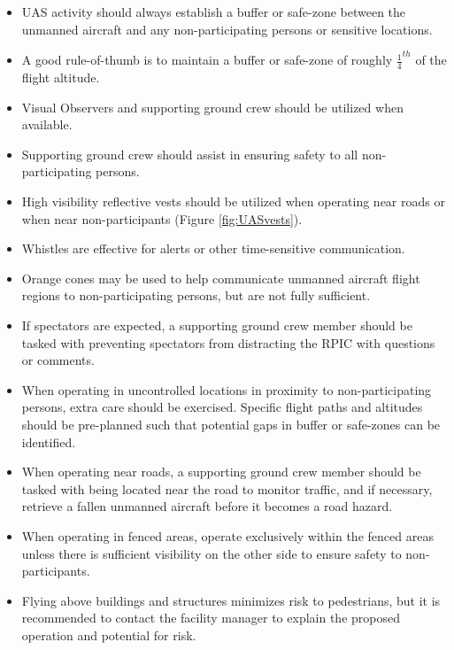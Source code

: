 \documentclass[
]{book}
\providecommand{\tightlist}{%
  \setlength{\itemsep}{0pt}\setlength{\parskip}{0pt}}
\begin{document}
\begin{itemize}
\tightlist
\item
  UAS activity should always establish a buffer or safe-zone between the unmanned aircraft and any non-participating persons or sensitive locations.\\
\item
  A good rule-of-thumb is to maintain a buffer or safe-zone of roughly \(\frac{1}{4}^{th}\) of the flight altitude.\\
\item
  Visual Observers and supporting ground crew should be utilized when available.
\item
  Supporting ground crew should assist in ensuring safety to all non-participating persons.
\item
  High visibility reflective vests should be utilized when operating near roads or when near non-participants (Figure \ref{fig:UASvests}).
\item
  Whistles are effective for alerts or other time-sensitive communication.
\item
  Orange cones may be used to help communicate unmanned aircraft flight regions to non-participating persons, but are not fully sufficient.
\item
  If spectators are expected, a supporting ground crew member should be tasked with preventing spectators from distracting the RPIC with questions or comments.
\item
  When operating in uncontrolled locations in proximity to non-participating persons, extra care should be exercised. Specific flight paths and altitudes should be pre-planned such that potential gaps in buffer or safe-zones can be identified.
\item
  When operating near roads, a supporting ground crew member should be tasked with being located near the road to monitor traffic, and if necessary, retrieve a fallen unmanned aircraft before it becomes a road hazard.
\item
  When operating in fenced areas, operate exclusively within the fenced areas unless there is sufficient visibility on the other side to ensure safety to non-participants.
\item
  Flying above buildings and structures minimizes risk to pedestrians, but it is recommended to contact the facility manager to explain the proposed operation and potential for risk.
\end{itemize}
\end{document}
